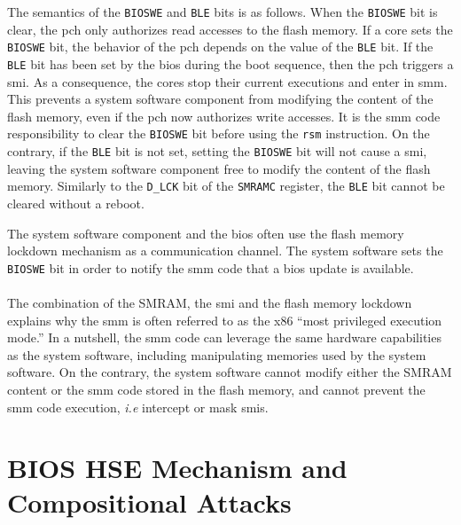 The semantics of the \texttt{BIOSWE} and \texttt{BLE} bits is as follows.
%
When the \texttt{BIOSWE} bit is clear, the \ac{pch} only authorizes read
accesses to the flash memory.
%
If a core sets the \texttt{BIOSWE} bit, the behavior of the \ac{pch} depends on
the value of the \texttt{BLE} bit.
%
If the \texttt{BLE} bit has been set by the \ac{bios} during the boot sequence,
then the \ac{pch} triggers a \ac{smi}.
%
As a consequence, the cores stop their current
executions and enter in \ac{smm}.
%
This prevents a system software component from modifying the content of the
flash memory, even if the \ac{pch} now authorizes write accesses.
%
It is the \ac{smm} code responsibility to clear the \texttt{BIOSWE} bit before
using the \texttt{rsm} instruction.
%
On the contrary, if the \texttt{BLE} bit is not set, setting the \texttt{BIOSWE}
bit will not cause a \ac{smi}, leaving the system software component free to
modify the content of the flash memory.
%
Similarly to the \texttt{D\_LCK} bit of the \texttt{SMRAMC} register, the
\texttt{BLE} bit cannot be cleared without a reboot.

The system software component and the \ac{bios} often use the flash memory
lockdown mechanism as a communication channel.
%
The system software sets the \texttt{BIOSWE} bit in order to notify the \ac{smm}
code that a \ac{bios} update is available.

\paragraph{}
%
The combination of the SMRAM, the \ac{smi} and the flash memory lockdown
explains why the \ac{smm} is often referred to as the x86 ``most privileged
execution mode.''
%
In a nutshell, the \ac{smm} code can leverage the same hardware capabilities
as the system software, including manipulating memories used by the system
software.
%
On the contrary, the system software cannot modify either the SMRAM content or
the \ac{smm} code stored in the flash memory, and cannot prevent the \ac{smm}
code execution, \emph{i.e} intercept or mask \acp{smi}.

\section{BIOS HSE Mechanism and Compositional Attacks}
\label{sec:usecase:hse}

